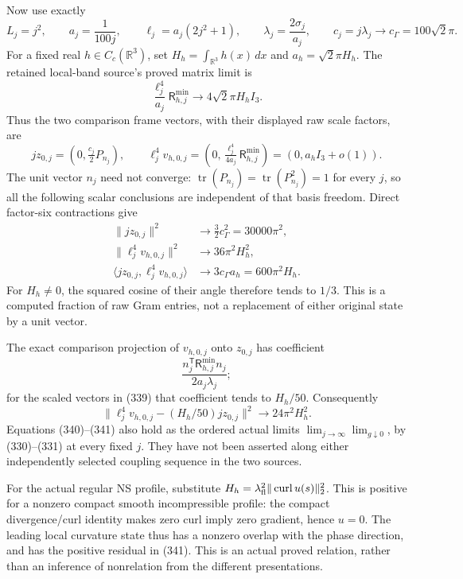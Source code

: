 \documentclass[
  11pt,
]{article}
\begin{document}
Now use exactly \[
 L_j=j^2,\qquad a_j=\frac1{100j},\qquad
 \ell_j=a_j(2j^2+1),\qquad \lambda_j=\frac{2\sigma_j}{a_j},
 \qquad c_j=j\lambda_j\longrightarrow c_\Gamma=100\sqrt2\pi.
\] For a fixed real \(h\in C_c(\mathbb R^3)\), set
\(H_h=\int_{\mathbb R^3}h(x)\,dx\) and \(a_h=\sqrt2\pi H_h\). The
retained local-band source's proved matrix limit is \[
 \frac{\ell_j^4}{a_j}{\mathsf R}_{h,j}^{\min}
       \longrightarrow 4\sqrt2\pi H_h I_3.
 \tag{338}
\] Thus the two comparison frame vectors, with their displayed raw scale
factors, are \[
 jz_{0,j}=(0,\tfrac{c_j}{2}P_{n_j}),\qquad
 \ell_j^4v_{h,0,j}=(0,\tfrac{\ell_j^4}{4a_j}
                      {\mathsf R}_{h,j}^{\min})
                 =(0,a_h I_3+o(1)).
 \tag{339}
\] The unit vector \(n_j\) need not converge:
\(\operatorname{tr}(P_{n_j})=\operatorname{tr}(P_{n_j}^2)=1\) for every
\(j\), so all the following scalar conclusions are independent of that
basis freedom. Direct factor-six contractions give \[
 \begin{split}
 \|jz_{0,j}\|^2&\longrightarrow\tfrac32c_\Gamma^2
                         =30000\pi^2,\\
 \|\ell_j^4v_{h,0,j}\|^2&\longrightarrow36\pi^2H_h^2,\\
 \langle jz_{0,j},\ell_j^4v_{h,0,j}\rangle
                  &\longrightarrow3c_\Gamma a_h
                         =600\pi^2H_h.
 \end{split}
 \tag{340}
\] For \(H_h\ne0\), the squared cosine of their angle therefore tends to
\(1/3\). This is a computed fraction of raw Gram entries, not a
replacement of either original state by a unit vector.

The exact comparison projection of \(v_{h,0,j}\) onto \(z_{0,j}\) has
coefficient \[
 \frac{n_j^{\mathsf T}{\mathsf R}_{h,j}^{\min}n_j}
               {2a_j\lambda_j};
\] for the scaled vectors in (339) that coefficient tends to \(H_h/50\).
Consequently \[
 \|\ell_j^4v_{h,0,j}-(H_h/50)jz_{0,j}\|^2
                   \longrightarrow24\pi^2H_h^2.
 \tag{341}
\] Equations (340)--(341) also hold as the ordered actual limits
\(\lim_{j\to\infty}\lim_{g\downarrow0}\), by (330)--(331) at every fixed
\(j\). They have not been asserted along either independently selected
coupling sequence in the two sources.

For the actual regular NS profile, substitute
\(H_h=\lambda_{\rm fl}^2\|\operatorname{curl}u(s)\|_2^2\). This is
positive for a nonzero compact smooth incompressible profile: the
compact divergence/curl identity makes zero curl imply zero gradient,
hence \(u=0\). The leading local curvature state thus has a nonzero
overlap with the phase direction, and has the positive residual in
(341). This is an actual proved relation, rather than an inference of
nonrelation from the different presentations.
\end{document}
